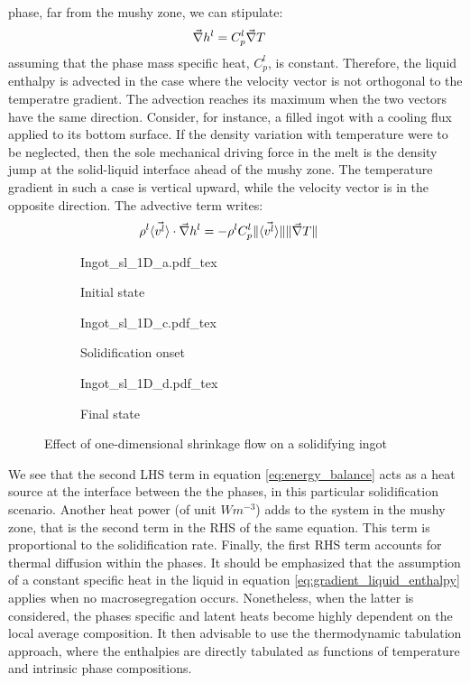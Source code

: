 phase, far from the mushy zone, we can stipulate:
%
\begin{align}
\label{eq:gradient_liquid_enthalpy}
& \vec{\nabla} h^l = C_p^l \vec{\nabla} T
\end{align}
%
assuming that the phase mass specific heat, $ C_p^l $, is constant. Therefore, the liquid enthalpy
is advected in the case where the velocity vector is not orthogonal to the temperatre gradient.
The advection reaches its maximum when the two vectors have the same direction. Consider, for instance,
a filled ingot with a cooling flux applied to its bottom surface. If the density variation with temperature
were to be neglected, then the sole mechanical driving force in the melt is the density jump at the solid-liquid
interface ahead of the mushy zone. The temperature gradient in such a case is vertical upward, while the velocity
vector is in the opposite direction. The advective term writes:
%
\begin{align}
& \rho^l \langle \vec{v^l} \rangle \cdot \vec{\nabla} h^l = - \rho^l C_p^l \lVert \langle \vec{v^l} \rangle \rVert \lVert \vec{\nabla} T \rVert
\end{align}
%
\begin{figure}
\centering
\begin{subfigure}[h!]{0.3\textwidth}\centering %
	\def\svgwidth{100pt}
	{Ingot_sl_1D_a.pdf_tex}
	\caption{Initial state}
	\label{fig:ingot_1d_a}
\end{subfigure}
\begin{subfigure}[h!]{0.3\textwidth}\centering %
	\centering
	\def\svgwidth{100pt}
	{Ingot_sl_1D_c.pdf_tex}
	\caption{Solidification onset}
	\label{fig:ingot_1d_c}
\end{subfigure}
\begin{subfigure}[h!]{0.3\textwidth}\centering %
	\centering
	\def\svgwidth{100pt}
	{Ingot_sl_1D_d.pdf_tex}
	\caption{Final state}
	\label{fig:ingot_1d_d}
\end{subfigure}
\caption{Effect of one-dimensional shrinkage flow on a solidifying ingot}
\end{figure}
%
We see that the second LHS term in equation \eqref{eq:energy_balance} acts as 
a heat source at the interface between the the phases, in this particular solidification
scenario. Another heat power (of unit $Wm^{-3}$) adds to the system in the mushy zone, 
that is the second term in the RHS of the same equation. This term is 
proportional to the solidification rate. Finally, the first RHS term accounts for thermal 
diffusion within the phases.
\newline
It should be emphasized that the assumption of a constant specific heat in the liquid in 
equation \eqref{eq:gradient_liquid_enthalpy} applies when no macrosegregation occurs. 
Nonetheless, when the latter is considered, the phases specific and latent heats become 
highly dependent on the local average composition. It then advisable to use the thermodynamic 
tabulation approach, where the enthalpies are directly tabulated as functions of temperature 
and intrinsic phase compositions. 
